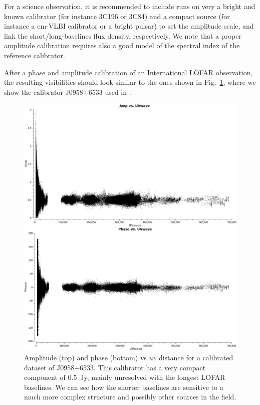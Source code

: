 \documentclass[graybox]{svmult}
\begin{document}
For a science observation, it is recommended to include runs on very a bright
and known calibrator (for instance 3C196 or 3C84) and a compact source
(for instance a cm-VLBI calibrator or a bright pulsar) to set the amplitude
scale, and link the short/long-baselines flux density, respectively. We
note that a proper amplitude calibration requires also a good model of the
spectral index of the reference calibrator.  

After a phase and amplitude calibration of an International LOFAR observation,
the resulting visibilities should look similar to the ones shown in
Fig.~\ref{fig:radplot}, where we show the calibrator J0958+6533 used in
\cite{varenius15}. 

\begin{figure}[htbp]
\begin{center}
\includegraphics[width=\textwidth]{figures/radplot.png}
\caption{Amplitude (top) and phase (bottom) vs $uv$ distance for a calibrated
dataset of J0958+6533. This calibrator has a very compact component of 0.5~Jy,
mainly unresolved with the longest LOFAR baselines. We can see how the shorter
baselines are sensitive to a much more complex structure and possibly other
sources in the field.}
\label{fig:radplot}
\end{center}
\end{figure}
\end{document}
